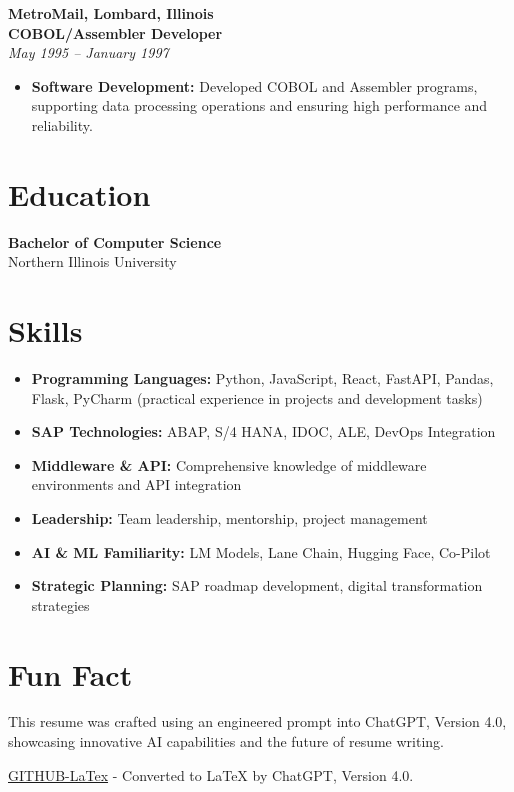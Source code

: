 \documentclass[a4paper,10pt]{article}
\begin{document}
\textbf{MetroMail, Lombard, Illinois} \\
\textbf{COBOL/Assembler Developer} \\
\textit{May 1995 – January 1997}
\begin{itemize}[leftmargin=2em]
    \item \textbf{Software Development:} Developed COBOL and Assembler programs, supporting data processing operations and ensuring high performance and reliability.
\end{itemize}

\section*{Education}
\textbf{Bachelor of Computer Science} \\
Northern Illinois University

\section*{Skills}
\begin{itemize}[leftmargin=2em]
    \item \textbf{Programming Languages:} Python, JavaScript, React, FastAPI, Pandas, Flask, PyCharm (practical experience in projects and development tasks)
    \item \textbf{SAP Technologies:} ABAP, S/4 HANA, IDOC, ALE, DevOps Integration
    \item \textbf{Middleware \& API:} Comprehensive knowledge of middleware environments and API integration
    \item \textbf{Leadership:} Team leadership, mentorship, project management
    \item \textbf{AI \& ML Familiarity:} LM Models, Lane Chain, Hugging Face, Co-Pilot
    \item \textbf{Strategic Planning:} SAP roadmap development, digital transformation strategies
\end{itemize}

\section*{Fun Fact}
This resume was crafted using an engineered prompt into ChatGPT, Version 4.0, showcasing innovative AI capabilities and the future of resume writing.

\href{https://github.com/WillyEth/ResumeWork/blob/main/LatexResume.tex}{\textcolor{headercolor}{GITHUB-LaTex}} - Converted to LaTeX by ChatGPT, Version 4.0.
\end{document}
